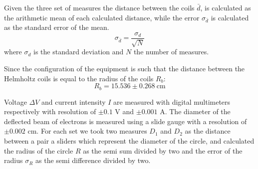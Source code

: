 Given the three set of measures the distance between the coils $\bar{d}$, is calculated as the arithmetic mean of each  calculated distance, while the error $\sigma_{\bar{d}}$ is calculated as the standard error of the mean.
\begin{equation*}
    \sigma_{\bar{d}}=\frac{\sigma_d}{\sqrt{N}}
\end{equation*}
where $\sigma_d$ is the standard deviation and $N$ the number of measures.

Since the configuration of the equipment is such that the distance between the Helmholtz coils is equal to the radius of the coils $R_b$:
\[
    R_b=15.536 \pm 0.268 \ \text{cm}
\]



Voltage $\Delta V$ and current intensity $I$ are measured with digital multimeters respectively with resolution of $\pm 0.1 \text{ V}$ and $\pm 0.001 \text{ A}$.
The diameter of the deflected beam of electrons is measured using a slide gauge with a resolution of $\pm 0.002 \text{ cm}$.
For each set we took two measures $D_1$ and $D_2$ as the distance between a pair a sliders which represent the diameter of the circle, and calculated the radius of the circle $R$ as the semi sum divided by two and the error of the radius $\sigma_R$ as the semi difference divided by two.

